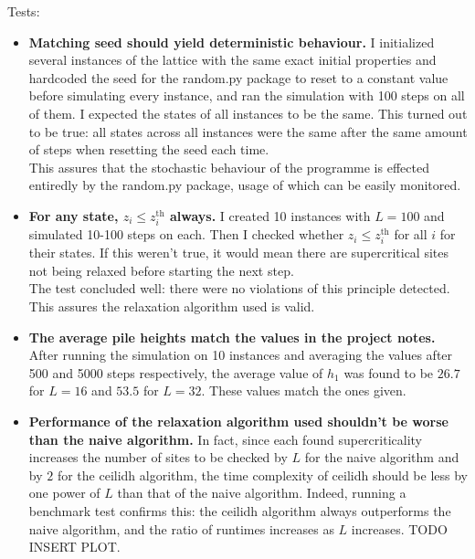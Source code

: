 \documentclass[a4paper,12pt]{article}
\begin{document}
Tests:
\begin{itemize}
\item \textbf{Matching seed should yield deterministic behaviour.} I initialized several instances of the lattice with the same exact initial properties and hardcoded the seed for the random.py package to reset to a constant value before simulating every instance, and ran the simulation with 100 steps on all of them. I expected the states of all instances to be the same. This turned out to be true: all states across all instances were the same after the same amount of steps when resetting the seed each time.\\
This assures that the stochastic behaviour of the programme is effected entiredly by the random.py package, usage of which can be easily monitored.

\item \textbf{For any state, $z_i\leq z^{\mathrm{th}}_i$ always.} I created 10 instances with $L=100$ and simulated 10-100 steps on each. Then I checked whether $z_i\leq z^{\mathrm{th}}_i$ for all $i$ for their states. If this weren't true, it would mean there are supercritical sites not being relaxed before starting the next step.\\
The test concluded well: there were no violations of this principle detected. This assures the relaxation algorithm used is valid.

\item \textbf{The average pile heights match the values in the project notes.} After running the simulation on 10 instances and averaging the values after 500 and 5000 steps respectively, the average value of $h_1$ was found to be $26.7$ for $L=16$ and $53.5$ for $L=32$. These values match the ones given.

\item \textbf{Performance of the relaxation algorithm used shouldn't be worse than the naive algorithm.} In fact, since each found supercriticality increases the number of sites to be checked by $L$ for the naive algorithm and by $2$ for the ceilidh algorithm, the time complexity of ceilidh should be less by one power of $L$ than that of the naive algorithm. Indeed, running a benchmark test confirms this: the ceilidh algorithm always outperforms the naive algorithm, and the ratio of runtimes increases as $L$ increases. TODO INSERT PLOT.
\end{itemize}


\end{document}
